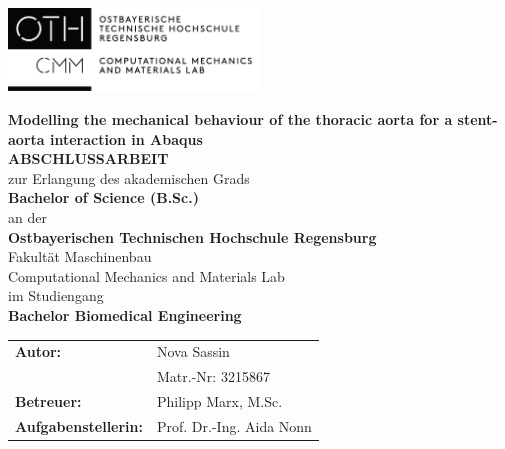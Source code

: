 \documentclass[11pt,a4paper,bibliography=totoc,listof=totoc,pointlessnumbers,open=any]{scrbook}
\begin{document}
\pagestyle{scrheadings}

\newpage
\thispagestyle{empty}
\begin{flushleft}
	\includegraphics[width=0.5\textwidth]{Titel/OTH_CMM_Logo.pdf}
\end{flushleft}

\begin{centering}
	\bigskip 
	\bigskip
	\bigskip
	\bigskip		
	\bigskip
	\huge\textrm{\textbf{Modelling the mechanical behaviour of the thoracic aorta for a stent-aorta interaction in Abaqus }}\\
	\bigskip
	\bigskip
	\bigskip 
	\bigskip 
	\bigskip
		\bigskip
		\bigskip 
		\bigskip
		\bigskip
	\LARGE\textrm{\textbf{ABSCHLUSSARBEIT}}\\
	\bigskip
	\small\textrm{zur Erlangung des akademischen Grads}\\
	\smallskip
	\large\textrm{\textbf{\glqq Bachelor of Science (B.Sc.)\grqq}}\\
	\smallskip
	\small\textrm{an der}\\
	\smallskip
	\large\textrm{\textbf{Ostbayerischen Technischen Hochschule Regensburg}}\\
	\smallskip
	\small\textrm{Fakultät Maschinenbau}\\
	\smallskip
	\small\textrm{Computational Mechanics and Materials Lab}\\
	\smallskip
	\small\textrm{im Studiengang}\\
	\smallskip
	\large\textrm{\textbf{Bachelor Biomedical Engineering}}
	\bigskip 
	\bigskip 
	\bigskip
	\bigskip
	\bigskip 
	\bigskip
	\bigskip 
	\bigskip
	\bigskip 
    \begin{table}[H]
    	\flushleft
    	\renewcommand{\arraystretch}{1.2}
    	\begin{tabular}{ll}
    	\textbf{Autor:} & \textrm{Nova Sassin} \\ 
    	 & \textrm{Matr.-Nr: } 3215867 \\
    	\textbf{Betreuer:} & \textrm{Philipp Marx, M.Sc.} \\ 
    	\textbf{Aufgabenstellerin:} & \textrm{Prof. Dr.-Ing. Aida Nonn}
    	\end{tabular}
    \end{table}
\end{centering}
\end{document}
